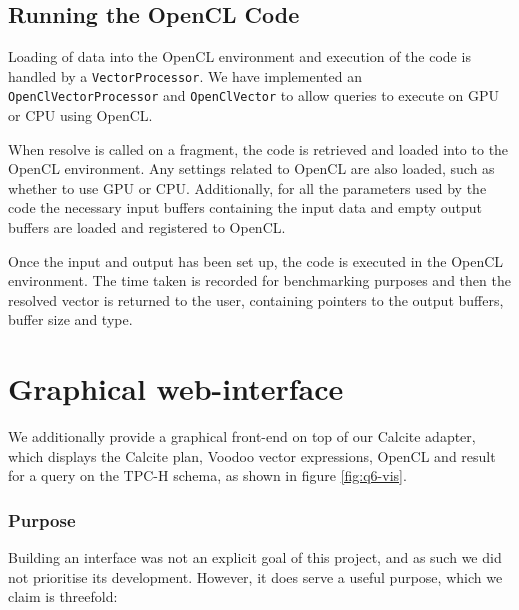 \subsection{Running the OpenCL Code}
Loading of data into the OpenCL environment and execution of the code is handled by a \texttt{VectorProcessor}. We have implemented an \texttt{OpenClVectorProcessor} and \texttt{OpenClVector} to allow queries to execute on GPU or CPU using OpenCL.

When resolve is called on a fragment, the code is retrieved and loaded into to the OpenCL environment. Any settings related to OpenCL are also loaded, such as whether to use GPU or CPU. Additionally, for all the parameters used by the code the necessary input buffers containing the input data and empty output buffers are loaded and registered to OpenCL.

Once the input and output has been set up, the code is executed in the OpenCL environment. The time taken is recorded for benchmarking purposes and then the resolved vector is returned to the user, containing pointers to the output buffers, buffer size and type.

\section{Graphical web-interface}

We additionally provide a graphical front-end on top of our Calcite adapter, which displays the Calcite plan, Voodoo vector expressions, OpenCL and result for a query on the TPC-H schema, as shown in figure \ref{fig:q6-vis}.

\subsubsection{Purpose}

Building an interface was not an explicit goal of this project, and as such we did not prioritise its development. However, it does serve a useful purpose, which we claim is threefold:

